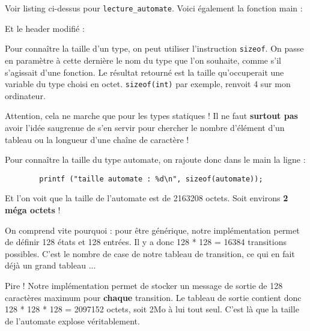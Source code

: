 \documentclass[10pt]{article}
\begin{document}
\begin{enumerate}[label=\textbf{[\alph*]}]
\item Voir listing ci-dessus pour \texttt{lecture\_automate}. Voici
  également la fonction main :

  \lstset{style=customc}
  
  \vspace{0.2cm}

  Et le header modifié :

  \lstset{style=customc}
  
  \vspace{0.2cm}
  \newpage

\item Pour connaître la taille d'un type, on peut utiliser
  l'instruction \texttt{sizeof}. On passe en paramètre à cette
  dernière le nom du type que l'on souhaite, comme s'il s'agissait
  d'une fonction. Le résultat retourné est la taille qu'occuperait une
  variable du type choisi en octet. \texttt{sizeof(int)} par
  exemple, renvoit 4 sur mon ordinateur.
  \vspace{0.2cm}

  Attention, cela ne marche que pour les types statiques ! Il ne faut
  \textbf{surtout pas} avoir l'idée saugrenue de s'en servir pour
  chercher le nombre d'élément d'un tableau ou la longueur d'une
  chaîne de caractère !
  \vspace{0.2cm}

  Pour connaître la taille du type automate, on rajoute donc dans le
  main la ligne :

\begin{lstlisting}
        printf ("taille automate : %d\n", sizeof(automate));
\end{lstlisting}
  \vspace{0.2cm}

  Et l'on voit que la taille de l'automate est de 2163208 octets. Soit
  environs \textbf{2 méga octets} !
  \vspace{0.2cm}

  On comprend vite pourquoi : pour être générique, notre
  implémentation permet de définir 128 états et 128 entrées. Il y a
  donc 128 * 128 = 16384 transitions possibles. C'est le nombre de
  case de notre tableau de transition, ce qui en fait déjà un grand
  tableau ...
  \vspace{0.2cm}

  Pire ! Notre implémentation permet de stocker un message de sortie
  de 128 caractères maximum pour \textbf{chaque} transition. Le
  tableau de sortie contient donc 128 * 128 * 128 = 2097152 octets,
  soit 2Mo à lui tout seul. C'est là que la taille de l'automate
  explose véritablement.
  \vspace{0.2cm}


\end{enumerate}
\end{document}
